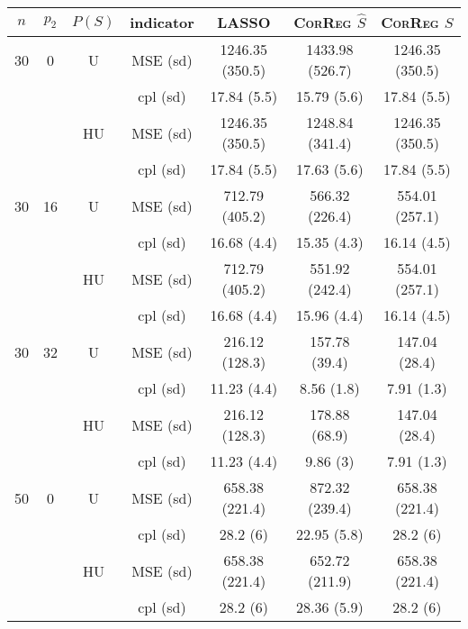 \documentclass[11pt,a4paper]{article}
\begin{document}
\begin{table}[h!]
\centering
\begin{tabular}{|c|c|c|c|c|c|c|}
\hline 
$n$ & $p_2$&  $P(S)$ &indicator &LASSO  &    \textsc{CorReg} $\hat S$& \textsc{CorReg} $S$\\ 
\hline %
30 & 0 & U&MSE (sd) & 1246.35 (350.5) & 1433.98 (526.7) & 1246.35 (350.5) \\
& & & cpl (sd) & 17.84 (5.5) & 15.79 (5.6) & 17.84 (5.5) \\
 &  &HU &MSE (sd) & 1246.35 (350.5) & 1248.84 (341.4) & 1246.35 (350.5) \\
& & & cpl (sd) & 17.84 (5.5) & 17.63 (5.6) & 17.84 (5.5) \\ 
\hline %
30 &16& U & MSE (sd) & 712.79 (405.2) & 566.32 (226.4) & 554.01 (257.1) \\
& & & cpl (sd) & 16.68 (4.4) & 15.35 (4.3) & 16.14 (4.5) \\
 &  & HU & MSE (sd) & 712.79 (405.2) & 551.92 (242.4) & 554.01 (257.1) \\
& & & cpl (sd) & 16.68 (4.4) & 15.96 (4.4) & 16.14 (4.5) \\
\hline %
30 & 32 & U & MSE (sd) & 216.12 (128.3) & 157.78 (39.4) & 147.04 (28.4) \\
& & & cpl (sd) & 11.23 (4.4) & 8.56 (1.8) & 7.91 (1.3) \\
 &  & HU & MSE (sd) & 216.12 (128.3) & 178.88 (68.9) & 147.04 (28.4) \\
& & & cpl (sd) & 11.23 (4.4) & 9.86 (3) & 7.91 (1.3) \\
\hline
\hline %
50 & 0 & U&MSE (sd) & 658.38 (221.4) & 872.32 (239.4) & 658.38 (221.4) \\
& & & cpl (sd) & 28.2 (6) & 22.95 (5.8) & 28.2 (6) \\
 &  & HU &MSE (sd) & 658.38 (221.4) & 652.72 (211.9) & 658.38 (221.4) \\
& & & cpl (sd) & 28.2 (6) & 28.36 (5.9) & 28.2 (6) \\

\end{tabular}
\end{table}
\end{document}
